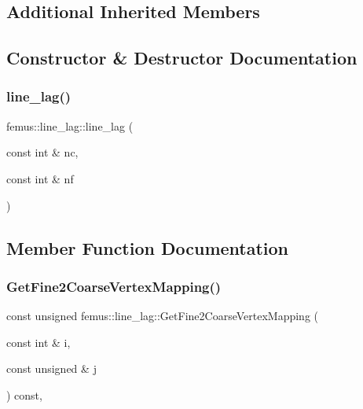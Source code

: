 \subsection*{Additional Inherited Members}


\subsection{Constructor \& Destructor Documentation}
\mbox{\label{classfemus_1_1line__lag_a77a33a3d152267c54cc88c4bdaaffc5c}} 
\subsubsection{\texorpdfstring{line\+\_\+lag()}{line\_lag()}}
{\footnotesize\ttfamily femus\+::line\+\_\+lag\+::line\+\_\+lag (\begin{DoxyParamCaption}\item[{const int \&}]{nc,  }\item[{const int \&}]{nf }\end{DoxyParamCaption})\hspace{0.3cm}{\ttfamily [inline]}}



\subsection{Member Function Documentation}
\mbox{\label{classfemus_1_1line__lag_a531a67a6075079df980485134a2ca93a}} 
\subsubsection{\texorpdfstring{Get\+Fine2\+Coarse\+Vertex\+Mapping()}{GetFine2CoarseVertexMapping()}}
{\footnotesize\ttfamily const unsigned femus\+::line\+\_\+lag\+::\+Get\+Fine2\+Coarse\+Vertex\+Mapping (\begin{DoxyParamCaption}\item[{const int \&}]{i,  }\item[{const unsigned \&}]{j }\end{DoxyParamCaption}) const\hspace{0.3cm}{\ttfamily [inline]}, {\ttfamily [virtual]}}



